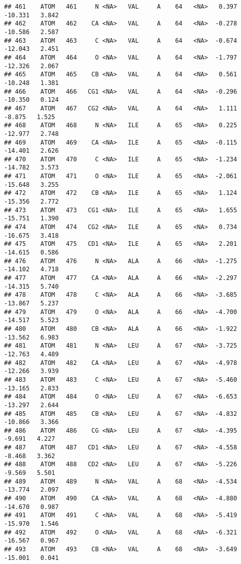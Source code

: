 \documentclass[
]{article}
\begin{document}
\begin{verbatim}
## 461    ATOM   461     N <NA>   VAL     A    64   <NA>   0.397 -10.331   3.842
## 462    ATOM   462    CA <NA>   VAL     A    64   <NA>  -0.278 -10.586   2.587
## 463    ATOM   463     C <NA>   VAL     A    64   <NA>  -0.674 -12.043   2.451
## 464    ATOM   464     O <NA>   VAL     A    64   <NA>  -1.797 -12.326   2.067
## 465    ATOM   465    CB <NA>   VAL     A    64   <NA>   0.561 -10.248   1.381
## 466    ATOM   466   CG1 <NA>   VAL     A    64   <NA>  -0.296 -10.350   0.124
## 467    ATOM   467   CG2 <NA>   VAL     A    64   <NA>   1.111  -8.875   1.525
## 468    ATOM   468     N <NA>   ILE     A    65   <NA>   0.225 -12.977   2.748
## 469    ATOM   469    CA <NA>   ILE     A    65   <NA>  -0.115 -14.401   2.626
## 470    ATOM   470     C <NA>   ILE     A    65   <NA>  -1.234 -14.782   3.573
## 471    ATOM   471     O <NA>   ILE     A    65   <NA>  -2.061 -15.648   3.255
## 472    ATOM   472    CB <NA>   ILE     A    65   <NA>   1.124 -15.356   2.772
## 473    ATOM   473   CG1 <NA>   ILE     A    65   <NA>   1.655 -15.751   1.390
## 474    ATOM   474   CG2 <NA>   ILE     A    65   <NA>   0.734 -16.675   3.418
## 475    ATOM   475   CD1 <NA>   ILE     A    65   <NA>   2.201 -14.615   0.586
## 476    ATOM   476     N <NA>   ALA     A    66   <NA>  -1.275 -14.102   4.718
## 477    ATOM   477    CA <NA>   ALA     A    66   <NA>  -2.297 -14.315   5.740
## 478    ATOM   478     C <NA>   ALA     A    66   <NA>  -3.685 -13.867   5.237
## 479    ATOM   479     O <NA>   ALA     A    66   <NA>  -4.700 -14.517   5.523
## 480    ATOM   480    CB <NA>   ALA     A    66   <NA>  -1.922 -13.562   6.983
## 481    ATOM   481     N <NA>   LEU     A    67   <NA>  -3.725 -12.763   4.489
## 482    ATOM   482    CA <NA>   LEU     A    67   <NA>  -4.978 -12.266   3.939
## 483    ATOM   483     C <NA>   LEU     A    67   <NA>  -5.460 -13.165   2.833
## 484    ATOM   484     O <NA>   LEU     A    67   <NA>  -6.653 -13.297   2.644
## 485    ATOM   485    CB <NA>   LEU     A    67   <NA>  -4.832 -10.866   3.366
## 486    ATOM   486    CG <NA>   LEU     A    67   <NA>  -4.395  -9.691   4.227
## 487    ATOM   487   CD1 <NA>   LEU     A    67   <NA>  -4.558  -8.468   3.362
## 488    ATOM   488   CD2 <NA>   LEU     A    67   <NA>  -5.226  -9.569   5.501
## 489    ATOM   489     N <NA>   VAL     A    68   <NA>  -4.534 -13.774   2.097
## 490    ATOM   490    CA <NA>   VAL     A    68   <NA>  -4.880 -14.670   0.987
## 491    ATOM   491     C <NA>   VAL     A    68   <NA>  -5.419 -15.970   1.546
## 492    ATOM   492     O <NA>   VAL     A    68   <NA>  -6.321 -16.567   0.967
## 493    ATOM   493    CB <NA>   VAL     A    68   <NA>  -3.649 -15.001   0.041

\end{verbatim}
\end{document}
